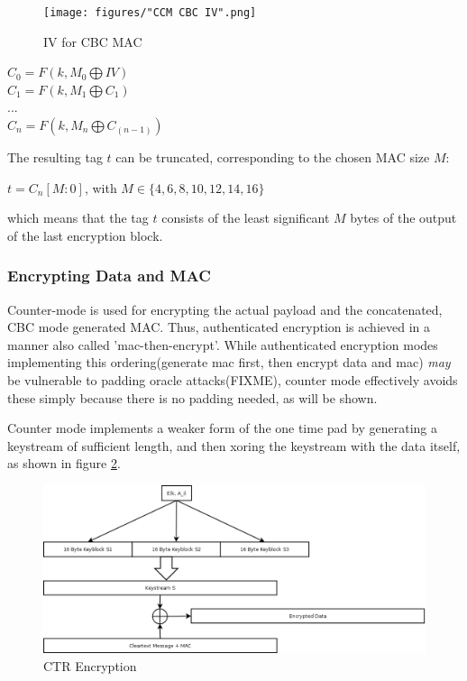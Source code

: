 \begin{figure}
    \centering
    \texttt{[image: figures/"CCM CBC IV".png]}
    \caption{IV for CBC MAC}
    \label{fig:ccrMacIV}
\end{figure}


\begin{center}
 $C_0 = F(k, M_0 \bigoplus IV )$
 \\
 $C_1 = F(k, M_1 \bigoplus C_1) $
 \\
 $...$
 \\
 $C_n = F(k, M_n \bigoplus C_{(n-1)})$
 \\
\end{center}

The resulting tag $t$ can be truncated, corresponding to the chosen MAC size $M$:
\begin{center}
  $t = C_n[M:0]$, with $M \in \{4, 6, 8, 10, 12, 14, 16\}$
\end{center}
which means that the tag $t$ consists of the least significant $M$ bytes of the output of the last encryption block.

\subsubsection{Encrypting Data and MAC}

Counter-mode is used for encrypting the actual payload and the concatenated, CBC mode generated MAC.
Thus, authenticated encryption is achieved in a manner also called 'mac-then-encrypt'. While authenticated
encryption modes implementing this ordering(generate mac first, then encrypt data and mac) \textit{may}
be vulnerable to padding oracle attacks(FIXME), counter mode effectively avoids these simply because
there is no padding needed, as will be shown.

Counter mode implements a weaker form of the one time pad by generating a keystream of sufficient
length, and then xoring the keystream with the data itself, as shown in figure \ref{fig:ctr}.

\begin{figure}
    \centering
    \includegraphics[width=1\textwidth]{figures/CTR.png}
    \caption{CTR Encryption}
    \label{fig:ctr}
\end{figure}

